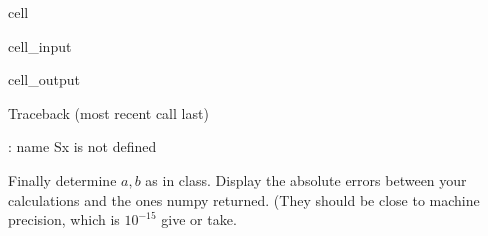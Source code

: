 \documentclass[letterpaper,10pt,english]{jupyterBook}
\begin{document}
\begin{sphinxuseclass}{cell}\begin{sphinxVerbatimInput}

\begin{sphinxuseclass}{cell_input}
\begin{sphinxVerbatim}[commandchars=\\\{\}]
    
\end{sphinxVerbatim}

\end{sphinxuseclass}\end{sphinxVerbatimInput}
\begin{sphinxVerbatimOutput}

\begin{sphinxuseclass}{cell_output}
\begin{sphinxVerbatim}[commandchars=\\\{\}]
Traceback (most recent call last)
 \PYG{p}{[}\PYG{p}{]}  
 
     

: name \PYGZsq{}Sx\PYGZsq{} is not defined
\end{sphinxVerbatim}

\end{sphinxuseclass}\end{sphinxVerbatimOutput}

\end{sphinxuseclass}
\sphinxAtStartPar
Finally determine \(a,b\) as in class. Display the absolute errors between your calculations and the ones numpy returned. (They should be close to machine precision, which is \(10^{-15}\) give or take.
\end{document}
